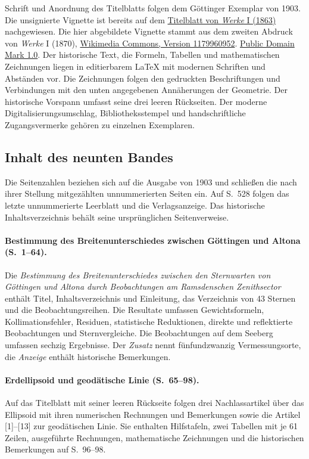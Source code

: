 Schrift und Anordnung des Titelblatts folgen dem Göttinger Exemplar von 1903. Die unsignierte Vignette ist bereits auf dem \href{https://gdz.sub.uni-goettingen.de/id/PPN235993352}{Titelblatt von \textit{Werke} I (1863)} nachgewiesen. Die hier abgebildete Vignette stammt aus dem zweiten Abdruck von \textit{Werke} I (1870), \href{https://commons.wikimedia.org/wiki/File:Gauss,_Carl_Friedrich_-_Vignette_-_von_Werke_(1870)_(page_9_crop).jpg}{Wikimedia Commons, Version 1179960952}. \href{https://creativecommons.org/publicdomain/mark/1.0/}{Public Domain Mark 1.0}. Der historische Text, die Formeln, Tabellen und mathematischen Zeichnungen liegen in editierbarem LaTeX mit modernen Schriften und Abständen vor. Die Zeichnungen folgen den gedruckten Beschriftungen und Verbindungen mit den unten angegebenen Annäherungen der Geometrie. Der historische Vorspann umfasst seine drei leeren Rückseiten. Der moderne Digitalisierungsumschlag, Bibliotheksstempel und handschriftliche Zugangsvermerke gehören zu einzelnen Exemplaren.

\subsection*{Inhalt des neunten Bandes}

\noindent Die Seitenzahlen beziehen sich auf die Ausgabe von 1903 und schließen die nach ihrer Stellung mitgezählten unnummerierten Seiten ein. Auf S.~528 folgen das letzte unnummerierte Leerblatt und die Verlagsanzeige. Das historische Inhaltsverzeichnis behält seine ursprünglichen Seitenverweise.

\paragraph{Bestimmung des Breitenunterschiedes zwischen Göttingen und Altona (S.~1--64).}
Die \textit{Bestimmung des Breitenunterschiedes zwischen den Sternwarten von Göttingen und Altona durch Beobachtungen am Ramsdenschen Zenithsector} enthält Titel, Inhaltsverzeichnis und Einleitung, das Verzeichnis von 43 Sternen und die Beobachtungsreihen. Die Resultate umfassen Gewichtsformeln, Kollimationsfehler, Residuen, statistische Reduktionen, direkte und reflektierte Beobachtungen und Sternvergleiche. Die Beobachtungen auf dem Seeberg umfassen sechzig Ergebnisse. Der \textit{Zusatz} nennt fünfundzwanzig Vermessungsorte, die \textit{Anzeige} enthält historische Bemerkungen.

\paragraph{Erdellipsoid und geodätische Linie (S.~65--98).}
Auf das Titelblatt mit seiner leeren Rückseite folgen drei Nachlassartikel über das Ellipsoid mit ihren numerischen Rechnungen und Bemerkungen sowie die Artikel [1]--[13] zur geodätischen Linie. Sie enthalten Hilfstafeln, zwei Tabellen mit je 61 Zeilen, ausgeführte Rechnungen, mathematische Zeichnungen und die historischen Bemerkungen auf S.~96--98.

